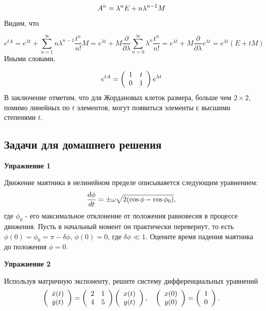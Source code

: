 \documentclass[a4paper,12pt]{article}
\begin{document}
\begin{equation}
A^{n}=\lambda^{n}E+n\lambda^{n-1}M
\notag
\end{equation}
Видим, что

\[
e^{tA}=e^{\lambda t}+\sum_{n=1}^{\infty}n\lambda^{n-1}\frac{t^{n}}{n!}M=e^{\lambda t}+M\frac{\partial}{\partial\lambda}\sum_{n=0}^{\infty}\lambda^{n}\frac{t^{n}}{n!}=e^{\lambda t}+M\frac{\partial}{\partial\lambda}e^{\lambda t}=e^{\lambda t}(E+tM)
\]
Иными словами,

\begin{equation}
e^{tA}=\left(\begin{array}{cc}
1 & t\\
0 & 1
\end{array}\right)e^{\lambda t}
\notag
\end{equation}
В заключение отметим, что для Жордановых клеток размера, больше чем $2 \times 2$, помимо линейных по $t$ элементов, могут появиться элементы с высшими степенями $t$.

\subsection*{Задачи для домашнего решения}

\noindent \textbf{Упражнение 1}

\noindent Движение маятника в нелинейном пределе описываяется следующим уравнением:
\begin{equation}\notag
\frac{d\phi}{dt}=\pm\omega\sqrt{2(\cos\phi-\cos\phi_{0})},
\end{equation}
где $\phi_{0}$ - его максимальное отклонение от положения равновесия в процессе движения. Пусть в начальный момент он практически перевернут, то есть $\phi(0)=\phi_{0}=\pi-\delta\phi$, $\dot{\phi}(0)=0$, где $\delta\phi\ll 1$. Оцените время падения маятника до положения $\phi=0$.

\vspace{15pt}
\noindent \textbf{Упражнение 2}

\noindent Используя матричную экспоненту, решите систему дифференциальных уравнений
\begin{equation}\notag
\left(\begin{array}{c}
\dot{x}(t)\\
\dot{y}(t)
\end{array}\right)	=\left(\begin{array}{cc}
2 & 1\\
4 & 5
\end{array}\right)\left(\begin{array}{c}
x(t)\\
y(t)
\end{array}\right),\quad\left(\begin{array}{c}
x(0)\\
y(0)
\end{array}\right)=\left(\begin{array}{c}
1\\
0
\end{array}\right).
\end{equation}
\end{document}
